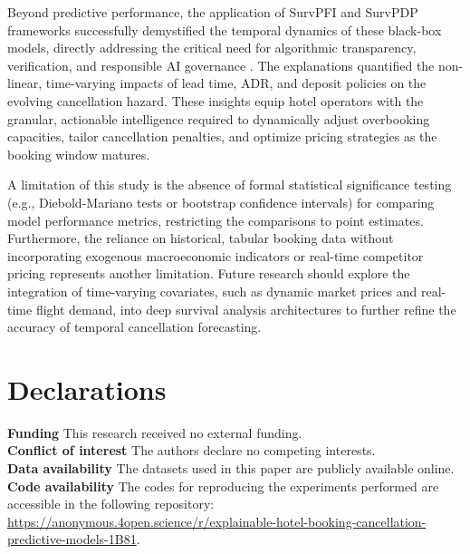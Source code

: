 \documentclass[pdflatex,sn-mathphys-ay]{sn-jnl}%
\theoremstyle{thmstyleone}%
\theoremstyle{thmstyletwo}%
\theoremstyle{thmstylethree}%
\begin{document}
Beyond predictive performance, the application of SurvPFI and SurvPDP frameworks successfully demystified the temporal dynamics of these black-box models, directly addressing the critical need for algorithmic transparency, verification, and responsible AI governance \citep{meske2022explainable}. The explanations quantified the non-linear, time-varying impacts of lead time, ADR, and deposit policies on the evolving cancellation hazard. These insights equip hotel operators with the granular, actionable intelligence required to dynamically adjust overbooking capacities, tailor cancellation penalties, and optimize pricing strategies as the booking window matures.

A limitation of this study is the absence of formal statistical significance testing (e.g., Diebold-Mariano tests or bootstrap confidence intervals) for comparing model performance metrics, restricting the comparisons to point estimates. Furthermore, the reliance on historical, tabular booking data without incorporating exogenous macroeconomic indicators or real-time competitor pricing represents another limitation. Future research should explore the integration of time-varying covariates, such as dynamic market prices and real-time flight demand, into deep survival analysis architectures to further refine the accuracy of temporal cancellation forecasting.

\backmatter

\section*{Declarations}

\noindent \textbf{Funding} This research received no external funding.\\

\noindent \textbf{Conflict of interest} The authors declare no competing interests.\\

\noindent \textbf{Data availability} The datasets used in this paper are publicly available online.\\

\noindent \textbf{Code availability} The codes for reproducing the experiments performed are accessible in the following repository: \url{https://anonymous.4open.science/r/explainable-hotel-booking-cancellation-predictive-models-1B81}.\\


\end{document}

